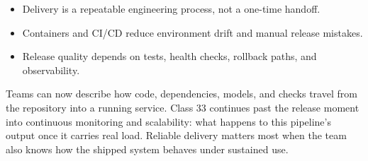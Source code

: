 \classclosingframe
{\begin{itemize}
\item Delivery is a repeatable engineering process, not a one-time handoff.
\item Containers and CI/CD reduce environment drift and manual release mistakes.
\item Release quality depends on tests, health checks, rollback paths, and observability.
\end{itemize}}
{Teams can now describe how code, dependencies, models, and checks travel from the repository into a running service.}
{Class 33 continues past the release moment into continuous monitoring and scalability: what happens to this pipeline's output once it carries real load.}
{Reliable delivery matters most when the team also knows how the shipped system behaves under sustained use.}


